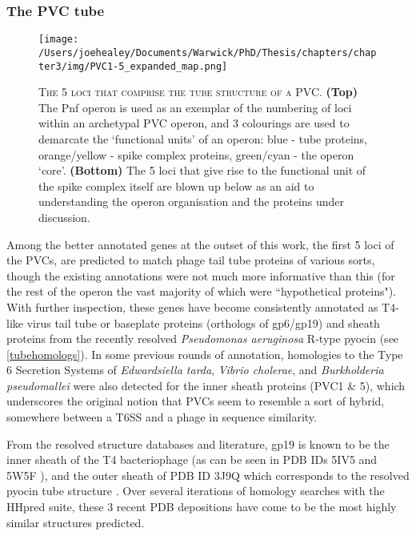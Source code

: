\subsubsection{The PVC tube}
\begin{figure}[h!]
\texttt{[image: /Users/joehealey/Documents/Warwick/PhD/Thesis/chapters/chapter3/img/PVC1-5\_expanded\_map.png]}
	\captionsetup{singlelinecheck=off, justification=justified, font=footnotesize, aboveskip=10pt}
	\caption[Tube protein region of a PVC operon]{\textsc{\normalsize The 5 loci that comprise the tube structure of a PVC.}\vspace{0.1cm} \newline \textbf{(Top)} The Pnf operon is used as an exemplar of the numbering of loci within an archetypal PVC operon, and 3 colourings are used to demarcate the `functional units' of an operon: blue - tube proteins, orange/yellow - spike complex proteins, green/cyan - the operon `core'. \textbf{(Bottom)} The 5 loci that give rise to the functional unit of the spike complex itself are blown up below as an aid to understanding the operon organisation and the proteins under discussion.}
	\label{PVC1-5map}
\end{figure}


Among the better annotated genes at the outset of this work, the first 5 loci of the PVCs, are predicted to match phage tail tube proteins of various sorts, though the existing annotations were not much more informative than this (for the rest of the operon the vast majority of which were ``hypothetical proteins"). With further inspection, these genes have become consistently annotated as T4-like virus tail tube or baseplate proteins (orthologs of gp6/gp19) and sheath proteins from the recently resolved \emph{Pseudomonas aeruginosa} R-type pyocin (see \vref{tubehomologs}). In some previous rounds of annotation, homologies to the Type 6 Secretion Systems of \emph{Edwardsiella tarda}, \emph{Vibrio cholerae}, and \emph{Burkholderia pseudomallei} were also detected for the inner sheath proteins (PVC1 \& 5), which underscores the original notion that PVCs seem to resemble a sort of hybrid, somewhere between a T6SS and a phage in sequence similarity.

From the resolved structure databases and literature, gp19 is known to be the inner sheath of the T4 bacteriophage (as can be seen in PDB IDs 5IV5 and 5W5F \citep{Taylor2016, Zheng2017}), and the outer sheath of PDB ID 3J9Q which corresponds to the resolved pyocin tube structure \citep{Ge2015}. Over several iterations of homology searches with the HHpred suite, these 3 recent PDB depositions have come to be the most highly similar structures predicted.

